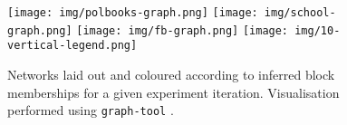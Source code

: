 \begin{figure}[!ht]
	\centering
	\texttt{[image: img/polbooks-graph.png]}
	\texttt{[image: img/school-graph.png]}
	\texttt{[image: img/fb-graph.png]}
	\texttt{[image: img/10-vertical-legend.png]}
	\caption{Networks laid out and coloured according to inferred block memberships for a given experiment iteration. Visualisation performed using \texttt{graph-tool} \cite{peixoto_graph-tool_2014}.}
	\label{fig:graphs-all}
\end{figure}
%
\begin{table}[!ht]
	\centering
	\caption{Experimental results averaged over $n=10$ iterations (mean $\pm$ std. dev.).}
	\label{tab:results}
\end{table}
